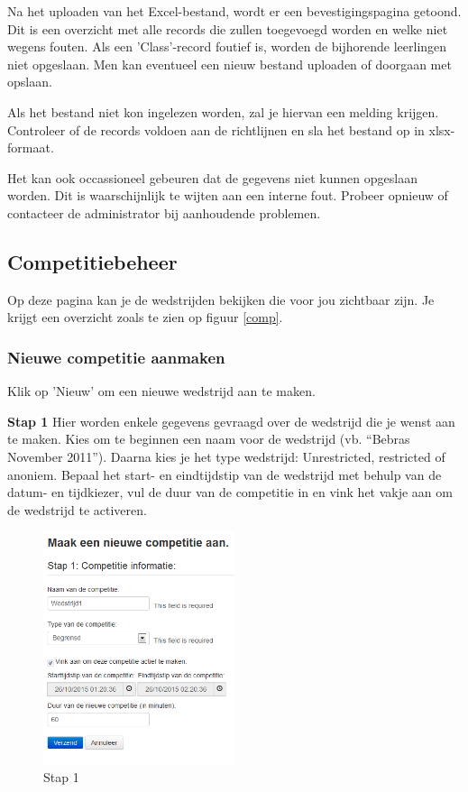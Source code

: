 \documentclass[]{article}
\begin{document}
Na het uploaden van het Excel-bestand, wordt er een bevestigingspagina getoond. Dit is een overzicht met alle records die zullen toegevoegd worden en welke niet wegens fouten. Als een 'Class'-record foutief is, worden de bijhorende leerlingen niet opgeslaan. Men kan eventueel een nieuw bestand uploaden of doorgaan met opslaan.

Als het bestand niet kon ingelezen worden, zal je hiervan een melding krijgen. Controleer of de records voldoen aan de richtlijnen en sla het bestand op in xlsx-formaat.

Het kan ook occassioneel gebeuren dat de gegevens niet kunnen opgeslaan worden. Dit is waarschijnlijk te wijten aan een interne fout. Probeer opnieuw of contacteer de administrator bij aanhoudende problemen. 

\subsection{Competitiebeheer}
Op deze pagina kan je de wedstrijden bekijken die voor jou zichtbaar zijn. Je krijgt een overzicht zoals te zien op figuur \ref{comp}. 

\subsubsection{Nieuwe competitie aanmaken}

Klik op 'Nieuw' om een nieuwe wedstrijd aan te maken.

\textbf{Stap 1}
Hier worden enkele gegevens gevraagd over de wedstrijd die je wenst aan te maken. 
Kies om te beginnen een naam voor de wedstrijd (vb. "`Bebras November 2011"'). Daarna kies je het type wedstrijd: Unrestricted, restricted of anoniem. Bepaal het start- en eindtijdstip van de wedstrijd met behulp van de datum- en tijdkiezer, vul de duur van de competitie in en vink het vakje aan om de wedstrijd te activeren.

\begin{figure}[!ht]
	\centering
	\includegraphics[width=0.5\textwidth]{img/stap1}
	\caption{Stap 1}
	\label{stap1}
\end{figure}
\end{document}
